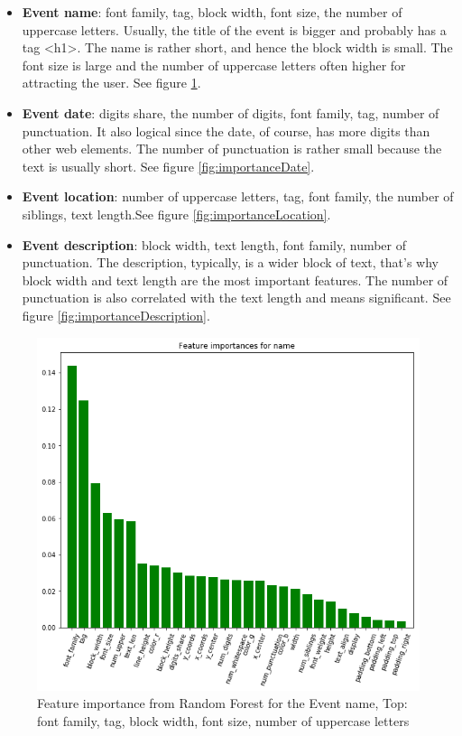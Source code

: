 \begin{itemize}
    \item \textbf{Event name}: font family, tag, block width, font size, the number of uppercase letters. Usually, the title of the event is bigger and probably has a tag <h1>. The name is rather short, and hence the block width is small. The font size is large and the number of uppercase letters often higher for attracting the user. See figure \ref{fig:importanceName}.
    \item \textbf{Event date}: digits share, the number of digits, font family, tag, number of punctuation. It also logical since the date, of course, has more digits than other web elements. The number of punctuation is rather small because the text is usually short. See figure \ref{fig:importanceDate}.
    \item \textbf{Event location}: number of uppercase letters, tag, font family, the number of siblings, text length.See figure \ref{fig:importanceLocation}.
    \item \textbf{Event description}: block width, text length, font family, number of punctuation. The description, typically, is a wider block of text, that's why block width and text length are the most important features. The number of punctuation is also correlated with the text length and means significant.  See figure \ref{fig:importanceDescription}.
\end{itemize}

\begin{figure}[h]
\begin{center}
\includegraphics[width=1.0\textwidth]{figures08/importanceName}
\caption{Feature importance from Random Forest for the Event name, Top: font family, tag, block width, font size, number of uppercase letters}
\label{fig:importanceName}
\end{center}
\end{figure}

